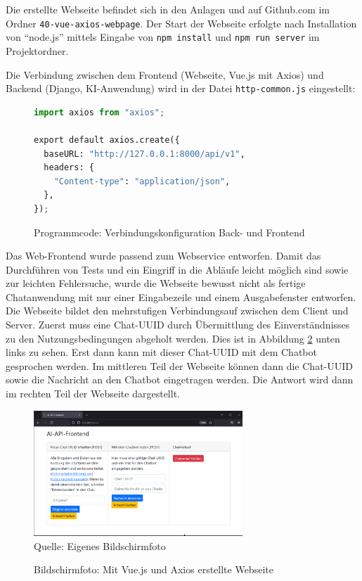 \documentclass[12pt,oneside,titlepage,listof=totoc,bibliography=totoc]{scrartcl}
\newcommand{\code}[1]{\colorbox{code-gray}{\texttt{#1}}}
\begin{document}
Die erstellte Webseite befindet sich in den Anlagen und auf Github.com im Ordner \code{40-vue-axios-webpage}. Der Start der Webseite erfolgte nach Installation von  \enquote{node.js} mittels Eingabe von \code{npm install} und \code{npm run server} im Projektordner. 

Die Verbindung zwischen dem Frontend (Webseite, Vue.js mit Axios) und Backend (Django, KI-Anwendung) wird in der Datei \code{http-common.js} eingestellt: 

\begin{figure}[H]
	\caption{Programmcode: Verbindungskonfiguration Back- und Frontend}
	\label{fig:code-http-backend-frontend-connection}
\begin{lstlisting}[language=python]
import axios from "axios";

export default axios.create({
  baseURL: "http://127.0.0.1:8000/api/v1",
  headers: {
    "Content-type": "application/json",
  },
});
\end{lstlisting}
\end{figure}

Das Web-Frontend wurde passend zum Webservice entworfen. Damit das Durchführen von Tests und ein Eingriff in die Abläufe leicht möglich sind sowie zur leichten Fehlersuche, wurde die Webseite bewusst nicht als fertige Chatanwendung mit nur einer Eingabezeile und einem Ausgabefenster entworfen. Die Webseite bildet den mehrstufigen Verbindungsauf zwischen dem Client und Server. Zuerst muss eine Chat-UUID durch Übermittlung des Einverständnisses zu den Nutzungsbedingungen abgeholt werden. Dies ist in Abbildung \ref{fig:web-frontend-leer} unten links zu sehen. Erst dann kann mit dieser Chat-UUID mit dem Chatbot gesprochen werden. Im mittleren Teil der Webseite können dann die Chat-UUID sowie die Nachricht an den Chatbot eingetragen werden. Die Antwort wird dann im rechten Teil der Webseite dargestellt. 


\begin{figure}[H]
	\caption{Bildschirmfoto: Mit Vue.js und Axios erstellte Webseite}\label{fig:web-frontend-leer}
	\includegraphics[width=0.7\textwidth]{web-frontend.png}
	\\
	Quelle: Eigenes Bildschirmfoto
\end{figure}
\end{document}

